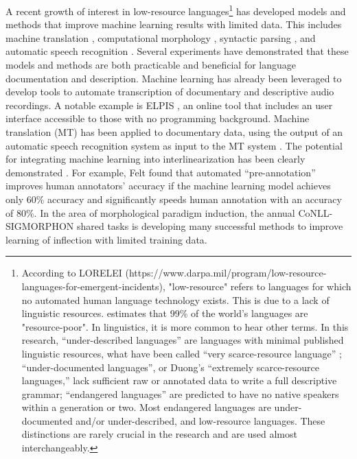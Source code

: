 A recent growth of interest in low-resource languages\footnote{According to LORELEI (https://www.darpa.mil/program/low-resource-languages-for-emergent-incidents), "low-resource" refers to languages for which no automated human language technology exists. This is due to a lack of linguistic resources. \citet{szymanski_morphological_2012} estimates that 99\% of the world's languages are "resource-poor". In linguistics, it is more common to hear other terms. In this research, ``under-described languages'' are languages with minimal published linguistic resources, what have been called ``very scarce-resource language'' \citep{duong_natural_2017}; ``under-documented languages'', or Duong's ``extremely scarce-resource languages,'' lack sufficient raw or annotated data to write a full descriptive grammar; ``endangered languages'' are predicted to have no native speakers within a generation or two. Most endangered languages are under-documented and/or under-described, and low-resource languages. These distinctions are rarely crucial in the research and are used almost interchangeably.} 
has developed models and methods that improve machine learning results with limited data. This includes machine translation \citep{abbott_towards_2018,gu_universal_2018,shearing_improving_2018,al_mumin_neural_2019,duh_benchmarking_2020}, computational morphology \citep{ruokolainen_supervised_2013,baumann_using_2014,micher_improving_2017,moeller_improving_2019}, syntactic parsing \citep{baldridge_learning_2013,duong-etal-2015-low,duong_natural_2017}, and automatic speech recognition \citep{adams_automatic_2017,anastasopoulos_computational_2019}. Several experiments have demonstrated that these models and methods are both practicable and beneficial for language documentation and description. Machine learning has already been leveraged to develop tools to automate transcription of documentary and descriptive audio recordings. A notable example is ELPIS \citep{foley_elpis_2018}, an online tool that includes an  user interface accessible to those with no programming background. Machine translation (MT) has been applied to documentary data, using the output of an automatic speech recognition system as input to the MT system \citep{anastasopoulos_unsupervised_2016,duong_attentional_2016}. The potential for integrating machine learning into interlinearization has been clearly demonstrated \citep{baldridge_how_2009,palmer_semi-automated_2009,palmer_computational_2010,xia_enriching_2016}. For example, Felt \citet{felt_improving_2012} found that automated ``pre-annotation'' improves human annotators' accuracy if the machine learning model achieves only 60\% accuracy and significantly speeds human annotation with an accuracy of 80\%. In the area of morphological paradigm induction, the annual CoNLL-SIGMORPHON shared tasks \citep{cotterell_sigmorphon_2016,cotterell_conll-sigmorphon_2017,cotterell_conllsigmorphon_2018,mccarthy-etal-2019-sigmorphon} is developing many successful methods to improve learning of inflection with limited training data. 

